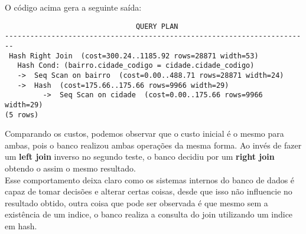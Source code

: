 \documentclass[12pt, a4paper, twoside, titlepage]{article}
\begin{document}
O código acima gera a seguinte saída: 
\begin{lstlisting}
                               QUERY PLAN
------------------------------------------------------------------------
 Hash Right Join  (cost=300.24..1185.92 rows=28871 width=53)
   Hash Cond: (bairro.cidade_codigo = cidade.cidade_codigo)
   ->  Seq Scan on bairro  (cost=0.00..488.71 rows=28871 width=24)
   ->  Hash  (cost=175.66..175.66 rows=9966 width=29)
         ->  Seq Scan on cidade  (cost=0.00..175.66 rows=9966 width=29)
(5 rows)
\end{lstlisting}
Comparando os custos, podemos observar que o custo inicial é o mesmo para ambas, pois o banco realizou ambas operações da mesma forma. Ao invés de fazer um \textbf{left join} inverso no segundo teste, o banco decidiu por um \textbf{right join} obtendo o assim o mesmo resultado.
\\Esse comportamento deixa claro como os sistemas internos do banco de dados é capaz de tomar decisões e alterar certas coisas, desde que isso não influencie no resultado obtido, outra coisa que pode ser observada é que mesmo sem a existência de um indice, o banco realiza a consulta do join utilizando um indice em hash. 
\end{document}
